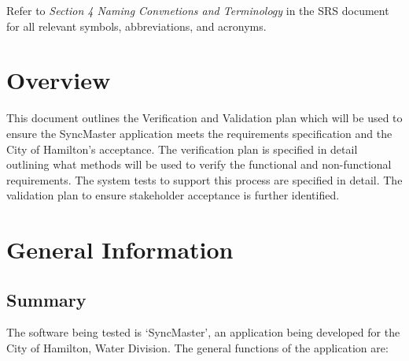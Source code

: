 \documentclass[12pt, titlepage]{article}
\begin{document}
Refer to \textit{Section 4 Naming Convnetions and Terminology} in the
SRS document\citep{SRS} for all relevant symbols, abbreviations, and acronyms.

\newpage


\section{Overview}

This document outlines the Verification and Validation plan which will be used
to ensure the SyncMaster application meets the requirements specification
and the City of Hamilton's acceptance. The verification plan is specified
in detail outlining what methods will be used to verify the
functional and non-functional
requirements. The system tests to support this process are specified in detail.
The validation plan to ensure stakeholder acceptance is further identified.

\section{General Information}

\subsection{Summary}

The software being tested is `SyncMaster', an application being
developed for the City of Hamilton, Water Division. The general
functions of the application are:
\end{document}
